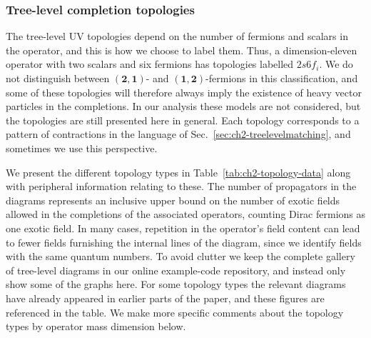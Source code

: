 \subsubsection{Tree-level completion topologies}

The tree-level UV topologies depend on the number of fermions and scalars in the
operator, and this is how we choose to label them. Thus, a dimension-eleven
operator with two scalars and six fermions has topologies labelled $2s6f_{i}$.
We do not distinguish between $(\mathbf{2}, \mathbf{1})$- and
$(\mathbf{1}, \mathbf{2})$-fermions in this classification, and some of these
topologies will therefore always imply the existence of heavy vector particles
in the completions. In our analysis these models are not considered, but the
topologies are still presented here in general. Each topology corresponds to a
pattern of contractions in the language of Sec.~\ref{sec:ch2-treelevelmatching}, and
sometimes we use this perspective.

We present the different topology types in Table~\ref{tab:ch2-topology-data} along
with peripheral information relating to these. The number of propagators in the
diagrams represents an inclusive upper bound on the number of exotic fields
allowed in the completions of the associated operators, counting Dirac fermions
as one exotic field. In many cases, repetition in the operator's field content
can lead to fewer fields furnishing the internal lines of the diagram, since we
identify fields with the same quantum numbers. To avoid clutter we keep the
complete gallery of tree-level diagrams in our online example-code repository,
and instead only show some of the graphs here. For some topology types the
relevant diagrams have already appeared in earlier parts of the paper, and these
figures are referenced in the table. We make more specific comments about the
topology types by operator mass dimension below.


